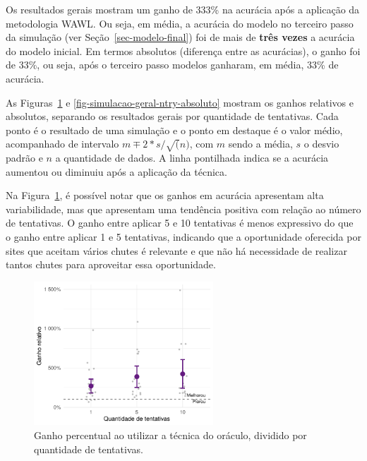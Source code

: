 \documentclass[12pt,twoside,brazilian]{book}
\begin{document}
Os resultados gerais mostram um ganho de 333\% na acurácia após a
aplicação da metodologia WAWL. Ou seja, em média, a acurácia do modelo
no terceiro passo da simulação (ver Seção~\ref{sec-modelo-final}) foi de
mais de \textbf{três vezes} a acurácia do modelo inicial. Em termos
absolutos (diferença entre as acurácias), o ganho foi de 33\%, ou seja,
após o terceiro passo modelos ganharam, em média, 33\% de acurácia.

As Figuras~\ref{fig-simulacao-geral-ntry-relativo} e
\ref{fig-simulacao-geral-ntry-absoluto} mostram os ganhos relativos e
absolutos, separando os resultados gerais por quantidade de tentativas.
Cada ponto é o resultado de uma simulação e o ponto em destaque é o
valor médio, acompanhado de intervalo \(m \mp 2*s/\sqrt(n)\), com \(m\)
sendo a média, \(s\) o desvio padrão e \(n\) a quantidade de dados. A
linha pontilhada indica se a acurácia aumentou ou diminuiu após a
aplicação da técnica.

Na Figura~\ref{fig-simulacao-geral-ntry-relativo}, é possível notar que
os ganhos em acurácia apresentam alta variabilidade, mas que apresentam
uma tendência positiva com relação ao número de tentativas. O ganho
entre aplicar 5 e 10 tentativas é menos expressivo do que o ganho entre
aplicar 1 e 5 tentativas, indicando que a oportunidade oferecida por
sites que aceitam vários chutes é relevante e que não há necessidade de
realizar tantos chutes para aproveitar essa oportunidade.

\begin{figure}

{\centering \includegraphics[width=0.6\textwidth,height=\textheight]{./resultados_files/figure-pdf/fig-simulacao-geral-ntry-relativo-1.pdf}

}

\caption{\label{fig-simulacao-geral-ntry-relativo}Ganho percentual ao
utilizar a técnica do oráculo, dividido por quantidade de tentativas.}

\end{figure}
\end{document}
